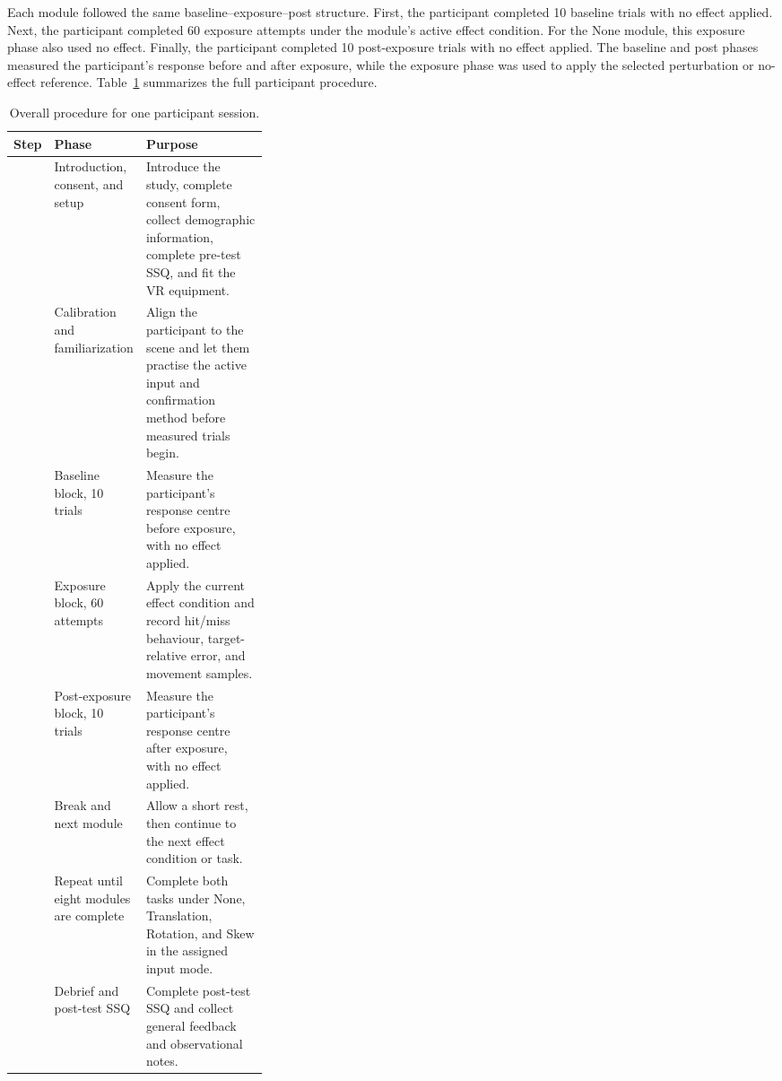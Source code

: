Each module followed the same baseline--exposure--post structure. First, the participant completed 10 baseline trials with no effect applied. Next, the participant completed 60 exposure attempts under the module's active effect condition. For the None module, this exposure phase also used no effect. Finally, the participant completed 10 post-exposure trials with no effect applied. The baseline and post phases measured the participant's response before and after exposure, while the exposure phase was used to apply the selected perturbation or no-effect reference. Table~\ref{tab:evaluation-procedure} summarizes the full participant procedure.

\begin{table}[H]
    \centering
    \footnotesize
    \setlength{\tabcolsep}{6pt}
    \renewcommand{\arraystretch}{1.18}
    \begin{tabularx}{\linewidth}{|
        >{\raggedright\arraybackslash}p{0.07\linewidth}|
        >{\raggedright\arraybackslash}p{0.26\linewidth}|
        >{\raggedright\arraybackslash}X|}
        \hline
        \textbf{Step} & \textbf{Phase} & \textbf{Purpose} \\
        \hline
        1 & Introduction, consent, and setup & Introduce the study, complete consent form, collect demographic information, complete pre-test SSQ, and fit the VR equipment. \\
        \hline
        2 & Calibration and familiarization & Align the participant to the scene and let them practise the active input and confirmation method before measured trials begin. \\
        \hline
        3 & Baseline block, 10 trials & Measure the participant's response centre before exposure, with no effect applied. \\
        \hline
        4 & Exposure block, 60 attempts & Apply the current effect condition and record hit/miss behaviour, target-relative error, and movement samples. \\
        \hline
        5 & Post-exposure block, 10 trials & Measure the participant's response centre after exposure, with no effect applied. \\
        \hline
        6 & Break and next module & Allow a short rest, then continue to the next effect condition or task. \\
        \hline
        7 & Repeat until eight modules are complete & Complete both tasks under None, Translation, Rotation, and Skew in the assigned input mode. \\
        \hline
        8 & Debrief and post-test SSQ & Complete post-test SSQ and collect general feedback and observational notes. \\
        \hline
    \end{tabularx}
    \caption{Overall procedure for one participant session.}
    \label{tab:evaluation-procedure}
\end{table}

